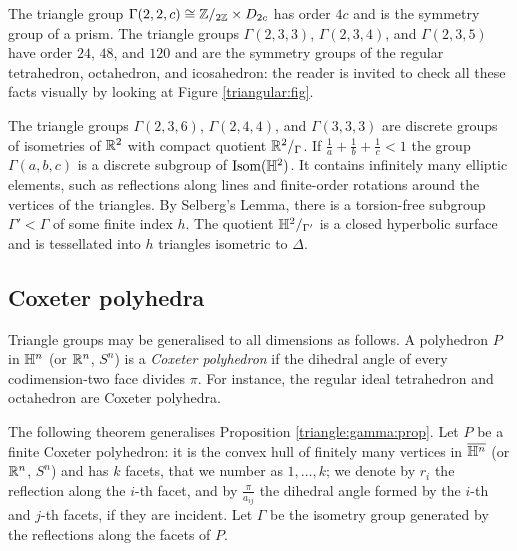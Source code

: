 The triangle group $\Gamma(2,2,c) \cong \mathbb{Z}/_{2\mathbb{Z}}\times D_{2c}$ has order $4c$ and is the symmetry group of a prism. The triangle groups $\Gamma(2,3,3)$, $\Gamma(2,3,4)$, and $\Gamma(2,3,5)$ have order $24$, $48$, and $120$ and are the symmetry groups of the regular tetrahedron, octahedron, and icosahedron: the reader is invited to check all these facts visually by looking at Figure \ref{triangular:fig}.

The triangle groups $\Gamma(2,3,6)$, $\Gamma(2,4,4)$, and $\Gamma(3,3,3)$ are discrete groups of isometries of $\mathbb{R}^2$ with compact quotient $\mathbb{R}^2/_\Gamma$. 
If $\frac 1a + \frac 1b + \frac 1c <1$ the group $\Gamma(a,b,c)$ is a discrete subgroup of ${\rm Isom}(\mathbb{H}^2)$. It contains infinitely many elliptic elements, such as reflections along lines and finite-order rotations around the vertices of the triangles. By Selberg's Lemma, there is a torsion-free subgroup $\Gamma' < \Gamma$ of some finite index $h$. The quotient $\mathbb{H}^2/_{\Gamma'}$ is a closed hyperbolic surface and is tessellated into $h$ triangles isometric to $\Delta$.

\subsection{Coxeter polyhedra}
Triangle groups may be generalised to all dimensions as follows. A polyhedron $P$ in $\mathbb{H}^n$ (or $\mathbb{R}^n$, $S^n$) is a \emph{Coxeter polyhedron} if the dihedral angle of every codimension-two face divides $\pi$. For instance, the regular ideal tetrahedron and octahedron are Coxeter polyhedra.

The following theorem generalises Proposition \ref{triangle:gamma:prop}. Let $P$ be a finite Coxeter polyhedron: it is the convex hull of finitely many vertices in $\overline{\mathbb{H}^n}$ (or $\mathbb{R}^n$, $S^n$) and has $k$ facets, that we number as $1, \ldots, k$; we denote by $r_i$ the reflection along the $i$-th facet, and by $\frac {\pi}{a_{ij}}$ the dihedral angle formed by the $i$-th and $j$-th facets, if they are incident. Let $\Gamma$ be the isometry group generated by the reflections along the facets of $P$.

